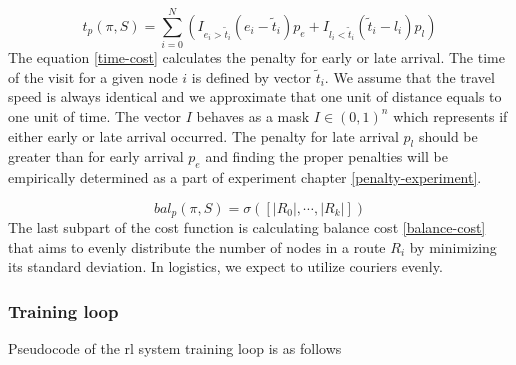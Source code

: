         \begin{equation}\label{time-cost}
            t_p(\pi, S) = \sum_{i=0}^N (I_{e_i > \widetilde{t}_i} (e_i - \widetilde{t}_i) p_e + I_{l_i < \widetilde{t}_i} (\widetilde{t}_i - l_i) p_l)
        \end{equation}
        The equation \ref{time-cost} calculates the penalty for early or late arrival. The time of the visit for a given node $i$ is defined by vector $\widetilde{t}_i$. We assume that the travel speed is always identical and we approximate that one unit of distance equals to one unit of time. The vector $I$ behaves as a mask $I \in (0, 1)^n$ which represents if either early or late arrival occurred. The penalty for late arrival $p_l$ should be greater than for early arrival $p_e$ and finding the proper penalties will be empirically determined as a part of experiment chapter \ref{penalty-experiment}.
        
        \begin{equation}\label{balance-cost}
            bal_p(\pi, S) = \sigma([|R_0|, \cdots, |R_k|])
        \end{equation}
        The last subpart of the cost function is calculating balance cost \ref{balance-cost} that aims to evenly distribute the number of nodes in a route $R_i$ by minimizing its standard deviation. In logistics, we expect to utilize couriers evenly.
        
        \subsubsection{Training loop}\label{vrptw-loop}
        
        Pseudocode of the \gls{rl} system training loop is as follows
        
